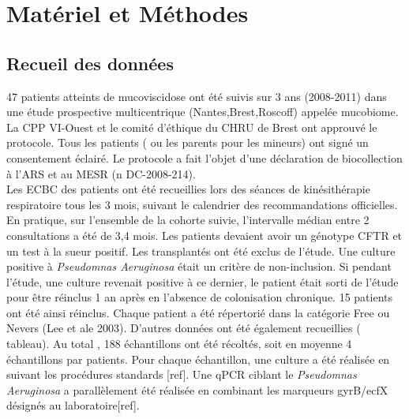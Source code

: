 \documentclass[12pt,a4paper]{article}
\begin{document}
\section{Matériel et Méthodes}
\subsection{Recueil des données}

47 patients atteints de mucoviscidose ont été suivis sur 3 ans (2008-2011) dans une étude prospective multicentrique (Nantes,Brest,Roscoff) appelée mucobiome.
La CPP VI-Ouest et le comité d’éthique du CHRU de Brest ont approuvé le protocole. Tous les patients ( ou les parents pour les mineurs) ont signé un consentement éclairé. Le protocole a fait l’objet d’une déclaration de biocollection à l’ARS et au MESR (n DC-2008-214).\\
Les ECBC des patients ont été recueillies lors des séances de kinésithérapie respiratoire tous les 3 mois, suivant le calendrier des recommandations officielles. En pratique, sur l’ensemble de la cohorte suivie, l’intervalle médian entre 2 consultations a été de 3,4 mois.
Les patients devaient avoir un génotype CFTR et un test à la sueur positif. Les transplantés ont été exclus de l’étude.
Une culture positive à \textit{Pseudomnas Aeruginosa} était un critère de non-inclusion. Si pendant l’étude, une culture revenait positive à ce dernier, le patient était sorti de l’étude pour être réinclus 1 an après en l’absence de colonisation chronique. 15 patients ont été ainsi réinclus.
Chaque patient a été répertorié dans la catégorie Free ou Nevers (Lee et ale 2003). D’autres données ont été également recueillies ( tableau).
Au total , 188 échantillons ont été récoltés, soit en moyenne 4 échantillons par patients.
Pour chaque échantillon, une culture a été réalisée en suivant les procédures standards [ref]. Une qPCR ciblant le \textit{Pseudomnas Aeruginosa} a parallèlement été réalisée en combinant les marqueurs gyrB/ecfX désignés au laboratoire[ref].
\end{document}
